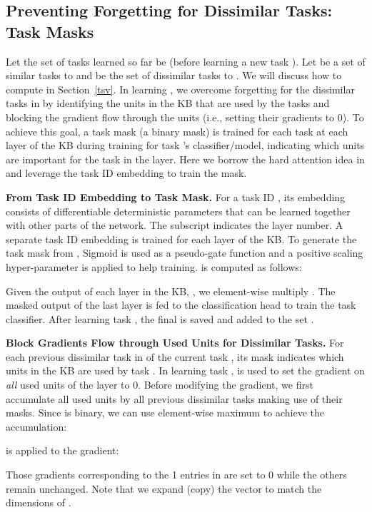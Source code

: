 \documentclass{article}
\begin{document}
\subsection{Preventing Forgetting for Dissimilar Tasks: Task Masks}

Let the set of tasks learned so far be  (before learning a new task ). Let  be a set of similar tasks to  and  be the set of dissimilar tasks to . We will discuss how to compute  in Section~\ref{tsv}. In learning , we overcome forgetting for the dissimilar tasks in  by identifying the units in the KB that are used by the tasks and blocking the gradient flow through the units (i.e., setting their gradients to 0). To achieve this goal, a task mask (a binary mask)  is trained for each task  at each layer  of the KB during training for task 's classifier/model, indicating which units are important for the task in the layer. Here we borrow the hard attention idea in \citep{Serra2018overcoming} and leverage the task ID embedding to train the mask.


\textbf{From Task ID Embedding to Task Mask. }
For a task ID , its embedding  consists of differentiable deterministic parameters that can be learned together with other parts of the network. The subscript  indicates the layer number. A separate task ID embedding is trained for each layer of the KB. {\color{black}To generate the task mask  from , Sigmoid is used as a pseudo-gate function and a positive scaling hyper-parameter  is applied to help training.}  is computed as follows:

Given the output of each layer in the KB, , we element-wise multiply . The masked output of the last layer  is fed to the  classification head to train the task classifier. After learning task , the final  is saved and added to the set . 

\textbf{Block Gradients Flow through Used Units for Dissimilar Tasks.} For each previous dissimilar task  in  of the current task , its mask  indicates which units in the KB are used by task . In learning task ,  is used to set the gradient  on \textit{all} used units of the layer  to 0. Before modifying the gradient, we first accumulate all used units by all previous dissimilar tasks making use of their masks. Since  is binary, we can use element-wise maximum to achieve the accumulation:  




 is applied to the gradient:

Those gradients corresponding to the 1 entries in  are set to 0 while the others remain unchanged. Note that we expand (copy) the vector  to match the dimensions of .
\end{document}
